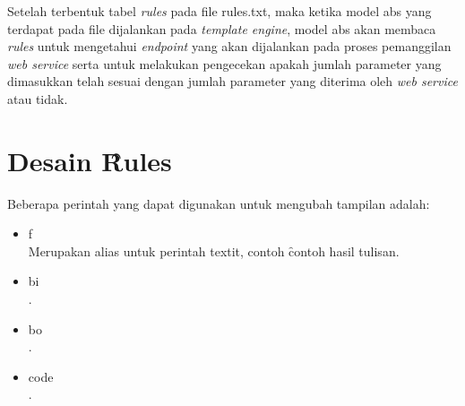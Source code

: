Setelah terbentuk tabel \textit{rules} pada file rules.txt, maka ketika model abs yang terdapat pada file dijalankan pada \textit{template engine}, model abs akan membaca \textit{rules} untuk mengetahui \textit{endpoint} yang akan dijalankan pada proses pemanggilan \textit{web service} serta untuk melakukan pengecekan apakah jumlah parameter yang dimasukkan telah sesuai dengan jumlah parameter yang diterima oleh \textit{web service} atau tidak.
\section{Desain \f{Rules}}
Beberapa perintah yang dapat digunakan untuk mengubah tampilan adalah: 
\begin{itemize}
	\item \bslash f \\
		Merupakan alias untuk perintah \bslash textit, contoh 
		\f{contoh hasil tulisan}.
	\item \bslash bi \\
		.
	\item \bslash bo \\
		.
	\item \bslash code \\ 
		.
\end{itemize}
